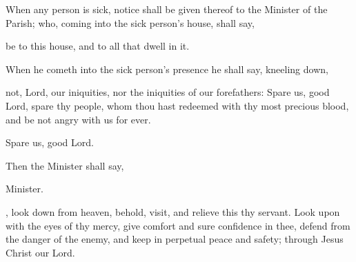
\begin{rubric}
When any person is sick, notice shall be given thereof to the Minister of the Parish; who, coming into the sick person's house, shall say,
\end{rubric}

 be to this house, and to all that dwell in it.

\begin{rubric}
When he cometh into the sick person's presence he shall say, kneeling down,
\end{rubric}

 not, Lord, our iniquities, nor the iniquities of our forefathers: Spare us, good Lord, spare thy people, whom thou hast redeemed with thy most precious blood, and be not angry with us for ever.

 Spare us, good Lord.

\begin{rubric}
Then the Minister shall say,
\end{rubric}






\newpage

\begin{rubric}
Minister.
\end{rubric}

, look down from heaven, behold, visit, and relieve this thy servant.
Look upon  with the eyes of thy mercy, give  comfort and sure confidence in thee, defend  from the danger of the enemy, and keep  in perpetual peace and safety; through Jesus Christ our Lord.

